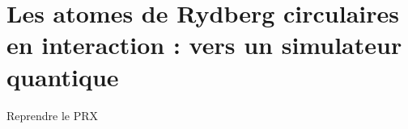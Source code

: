 \chapter{Les atomes de Rydberg circulaires en interaction : vers un simulateur quantique}
\label{chapter:circsim}

Reprendre le PRX